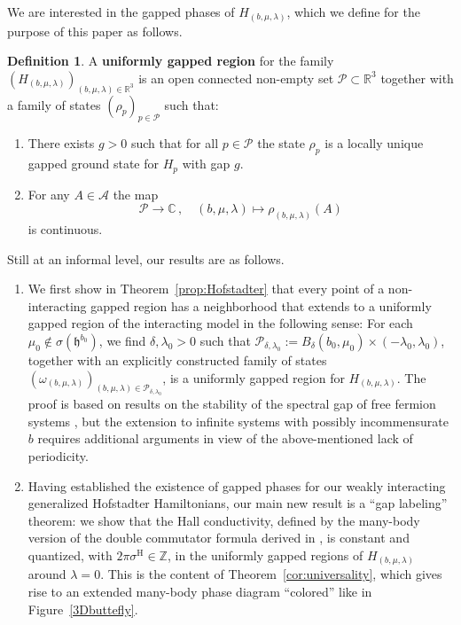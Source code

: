 \documentclass[a4paper]{article}
\newcommand{\w}{\omega}
\newcommand{\Z}{\mathbb{Z}}
\newcommand{\C}{\mathbb{C}}
\newcommand{\mA}{\mathcal{A}}
\newcommand{\R}{\mathbb{R}}
\newcommand{\mP}{\mathcal{P}}
\theoremstyle{plain}
\theoremstyle{definition}
\newtheorem{definition}[theorem]{Definition}
\theoremstyle{remark}
\renewcommand{\(}{\left(}
\renewcommand{\)}{\right)}
\begin{document}
We are interested in the gapped phases of $H_{(b,\mu,\lambda)}$, which we define for the purpose of this paper as follows.

\medskip


\begin{definition}
A {\bf uniformly gapped  region} for the family $(H_{(b,\mu,\lambda)})_{(b,\mu,\lambda)\in\R^3}$ is an open connected non-empty set $\mP \subset\R^3$ together with a family of states $(\rho_{p})_{{p}\in \mP}$ such that:
\begin{enumerate}
    \item[(i)]
There exists $g>0$ such that for all $p \in \mP $ the state 
$\rho_{p}$ is a locally unique gapped ground state for $H_{p}$ with gap $g$.
\item[(ii)]
For any $A\in \mA$    the map 
\[
\mP \to \C\,,\quad  
(b,\mu,\lambda)\mapsto \rho_{(b,\mu,\lambda)} (A)
\]
is continuous. 
\end{enumerate}
\end{definition}



\medskip

Still at an informal level, our results are as follows.
\begin{enumerate}
 \item 
 We first show in Theorem~\ref{prop:Hofstadter} that every point of a non-interacting gapped region has a neighborhood that extends to a uniformly gapped region of the interacting model in the following sense: For each $\mu_0\notin \sigma(\mathfrak{h}^{b_0})$, we find $\delta,\lambda_0>0$ such that $\mathcal{P}_{\delta,\lambda_0} := B_\delta(b_0,\mu_0 )\times (-\lambda_0,\lambda_0)$, together
 with an explicitly constructed family of states $(\w_{(b,\mu,\lambda)})_{(b,\mu,\lambda)\in \mathcal{P}_{\delta,\lambda_0}}$,
 is a uniformly gapped region for $H_{(b,\mu,\lambda)}$.   The proof is based on results on the stability of the spectral gap of free fermion systems \cite{de2019persistence, hastings2019stability, GMP2017}, but the extension to infinite systems with possibly incommensurate $b$ requires additional arguments in view of the above-mentioned lack of periodicity.
 \item Having established the existence of gapped phases for our weakly interacting generalized Hofstadter Hamiltonians, our main new result is a ``gap labeling'' theorem: we show that the Hall conductivity, defined by the many-body version of the double commutator formula derived in \cite{WMMMT24}, is constant and quantized, with $2\pi\sigma^{\mathrm H}\in\Z$,  in the uniformly gapped regions of $H_{(b,\mu,\lambda)}$ around $\lambda=0$. This is the content of Theorem~\ref{cor:universality}, which gives rise to an extended many-body phase diagram ``colored'' like in Figure~\ref{3Dbuttefly}.
\end{enumerate}
\end{document}
